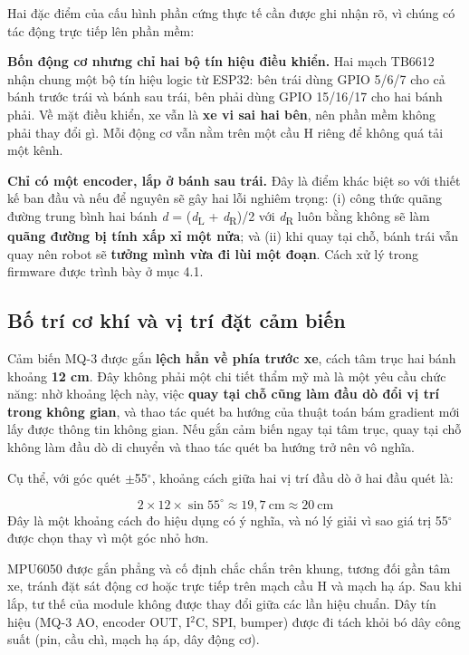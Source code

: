 Hai đặc điểm của cấu hình phần cứng thực tế cần được ghi nhận rõ, vì chúng có tác động trực tiếp lên phần mềm:

\textbf{Bốn động cơ nhưng chỉ hai bộ tín hiệu điều khiển.} Hai mạch TB6612 nhận chung một bộ tín hiệu logic từ ESP32: bên trái dùng GPIO 5/6/7 cho cả bánh trước trái và bánh sau trái, bên phải dùng GPIO 15/16/17 cho hai bánh phải. Về mặt điều khiển, xe vẫn là \textbf{xe vi sai hai bên}, nên phần mềm không phải thay đổi gì. Mỗi động cơ vẫn nằm trên một cầu H riêng để không quá tải một kênh.

\textbf{Chỉ có một encoder, lắp ở bánh sau trái.} Đây là điểm khác biệt so với thiết kế ban đầu và nếu để nguyên sẽ gây hai lỗi nghiêm trọng: (i) công thức quãng đường trung bình hai bánh \textit{d} = (\textit{d}\textsubscript{L} + \textit{d}\textsubscript{R})/2 với \textit{d}\textsubscript{R} luôn bằng không sẽ làm \textbf{quãng đường bị tính xấp xỉ một nửa}; và (ii) khi quay tại chỗ, bánh trái vẫn quay nên robot sẽ \textbf{tưởng mình vừa đi lùi một đoạn}. Cách xử lý trong firmware được trình bày ở mục 4.1.


\subsection{Bố trí cơ khí và vị trí đặt cảm biến}
Cảm biến MQ-3 được gắn \textbf{lệch hẳn về phía trước xe}, cách tâm trục hai bánh khoảng \textbf{12 cm}. Đây không phải một chi tiết thẩm mỹ mà là một yêu cầu chức năng: nhờ khoảng lệch này, việc \textbf{quay tại chỗ cũng làm đầu dò đổi vị trí trong không gian}, và thao tác quét ba hướng của thuật toán bám gradient mới lấy được thông tin không gian. Nếu gắn cảm biến ngay tại tâm trục, quay tại chỗ không làm đầu dò di chuyển và thao tác quét ba hướng trở nên vô nghĩa.

Cụ thể, với góc quét $\pm$55$^\circ$, khoảng cách giữa hai vị trí đầu dò ở hai đầu quét là:

\[ 2 \times 12 \times \sin 55^{\circ} \approx 19{,}7~\text{cm} \approx 20~\text{cm} \]
Đây là một khoảng cách đo hiệu dụng có ý nghĩa, và nó lý giải vì sao giá trị 55$^\circ$ được chọn thay vì một góc nhỏ hơn.

MPU6050 được gắn phẳng và cố định chắc chắn trên khung, tương đối gần tâm xe, tránh đặt sát động cơ hoặc trực tiếp trên mạch cầu H và mạch hạ áp. Sau khi lắp, tư thế của module không được thay đổi giữa các lần hiệu chuẩn. Dây tín hiệu (MQ-3 AO, encoder OUT, I$^{2}$C, SPI, bumper) được đi tách khỏi bó dây công suất (pin, cầu chì, mạch hạ áp, dây động cơ).


